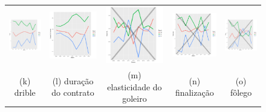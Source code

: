 \documentclass[doc,apacite,oneside,a4paper,12pt]{apa6}
\begin{document}
\begin{figure}
\begin{tabular}{ccccc}
 \includegraphics[width=25mm]{dribles_result} & \includegraphics[width=25mm]{duracaodocontrato_result} &   \includegraphics[width=25mm]{elast_gl_result} &
  \includegraphics[width=25mm]{finalizacao_result} & \includegraphics[width=25mm]{folego_result}  \\
 \scriptsize{(k) drible} & \scriptsize{(l) duração do contrato } & \scriptsize{(m) elasticidade do goleiro} & \scriptsize{(n) finalização} & \scriptsize{(o) fôlego}\\[3pt]
 

\end{tabular}
\end{figure}
\end{document}
